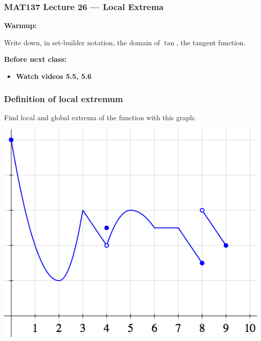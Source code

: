 \documentclass[14pt]{beamer}
\date{}
\title{}
\author{}
\begin{document}

\begin{frame}
	\frametitle{MAT137 Lecture 26 --- Local Extrema}

	{\bf Warmup:}

	Write down, in set-builder notation, the domain of $\tan$, the tangent function.

	\vfill
	{\bf Before next class:}
		\begin{itemize} \normalsize
			\item {\bf Watch videos  5.5, 5.6}
		\end{itemize}
\end{frame}

	\begin{frame}
		\frametitle{Definition of local extremum}

		Find local and global extrema of the function with this graph:

		\begin{center}
			\includegraphics[scale=.42]{G13}
		\end{center}
	\end{frame}
\end{document}
